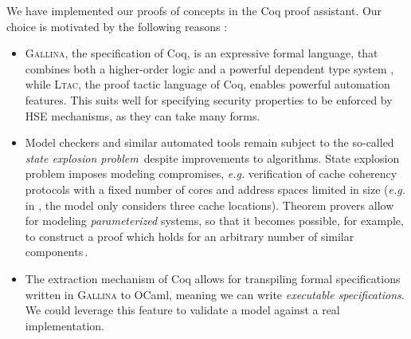 We have implemented our proofs of concepts in the Coq proof assistant.
%
Our choice is motivated by the following reasons :
%
\begin{itemize}
\item {\scshape Gallina}, the specification of Coq, is an expressive formal
  language, that combines both a higher-order logic and a powerful dependent
  type system , while {\scshape Ltac}, the proof tactic language of Coq, enables
  powerful automation features. 
  This suits well for specifying security properties to be enforced by HSE
  mechanisms, as they can take many forms. 
\item Model checkers and similar automated tools remain subject to the so-called
  \emph{state explosion problem}\,\cite{clarke2012model} despite improvements to
  algorithms.
  State explosion problem imposes modeling compromises, \emph{e.g.}
  verification of cache coherency protocols with a fixed number of cores and
  address spaces limited in size (\emph{e.g.} in \cite{lie2003xom}, the model
  only considers three cache locations). 
  Theorem provers allow for modeling \emph{parameterized} systems, so that it
  becomes possible, for example, to construct a proof which holds for an
  arbitrary number of similar components\,\cite{vijayaraghavan2015modular}. 
\item The extraction mechanism of Coq allows for transpiling formal
  specifications written in {\scshape Gallina} to OCaml, meaning we can write
  \emph{executable specifications}.
  We could leverage this feature to validate a model against a real
  implementation.
\end{itemize}

